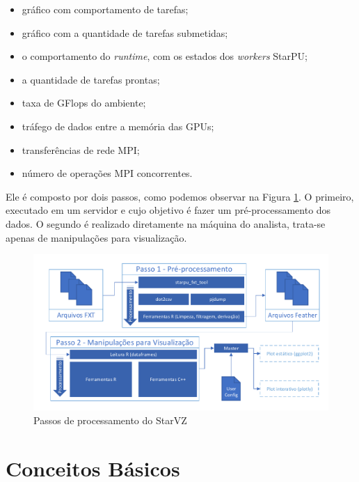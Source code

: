 \begin{itemize}
    \item gráfico com comportamento de tarefas;
    \item gráfico com a quantidade de tarefas submetidas;
    \item o comportamento do \emph{runtime}, com os estados dos \emph{workers} StarPU;
    \item a quantidade de tarefas prontas;
    \item taxa de GFlops do ambiente;
    \item tráfego de dados entre a memória das GPUs;
    \item transferências de rede MPI;
    \item número de operações MPI concorrentes.
\end{itemize}

Ele é composto por dois passos, como podemos observar na Figura \ref{fig:starvz-steps}. O primeiro, executado em um servidor e cujo objetivo é fazer um pré-processamento dos dados. O segundo é realizado diretamente na máquina do analista, trata-se apenas de manipulações para visualização.

\begin{figure}[H]
 \centerline{\includegraphics[width=1\textwidth]{./images/all-proc.pdf}}
 \caption{Passos de processamento do StarVZ}
 \label{fig:starvz-steps}
\end{figure}


















\section{Conceitos Básicos} \label{sect:basic-concepts}


